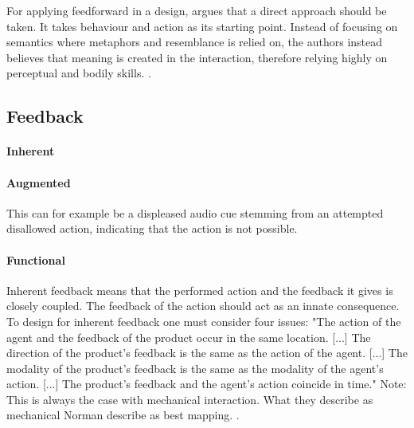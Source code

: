 For applying feedforward in a design,  argues that a direct approach should be taken. It takes behaviour and action as its starting point. Instead of focusing on semantics where metaphors and resemblance is relied on, the authors instead believes that meaning is created in the interaction, therefore relying highly on perceptual and bodily skills. \cite{howdonald}.

\subsection{Feedback}
\paragraph{Inherent}
\paragraph{Augmented} This can for example be a displeased audio cue stemming from an attempted disallowed action, indicating that the action is not possible.
\paragraph{Functional}
Inherent feedback means that the performed action and the feedback it gives is closely coupled. The feedback of the action should act as an innate consequence. To design for inherent feedback one must consider four issues: "The action of the agent and the feedback of the product occur in the
same location. [...] The direction of the product's feedback is the same as the action of
the agent. [...] The modality of the product's feedback is the same as the modality
of the agent's action. [...] The product's feedback and the agent's action coincide in time."
Note: This is always the case with mechanical interaction. What they describe as mechanical Norman describe as best mapping.
\cite{howdonald}.






\newpage
